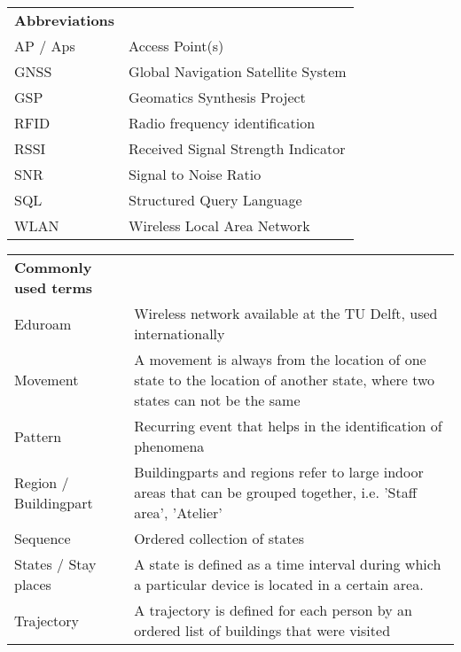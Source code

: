 \begin{table}[H]
\label{my-label}
\begin{tabular}{ll}
\textbf{Abbreviations} &                                    \\
AP / Aps               & Access Point(s)                    \\
GNSS                   & Global Navigation Satellite System \\
GSP                    & Geomatics Synthesis Project        \\
RFID                   & Radio frequency identification     \\
RSSI                   & Received Signal Strength Indicator \\
SNR                    & Signal to Noise Ratio              \\
SQL                    & Structured Query Language          \\
WLAN                   & Wireless Local Area Network        \\
\end{tabular}
\end{table}
\begin{table}[H]
\label{my-label}
\begin{tabular}{ll}
\textbf{Commonly used terms} &                                                                                                                            \\
Eduroam                      & Wireless network available at the TU Delft, used internationally                                                          \\
Movement                     & A movement is always from the location of one state to the location of another state, where two states can not be the same \\
Pattern                      & Recurring event that helps in the identification of phenomena                                                              \\
Region / Buildingpart        & Buildingparts and regions refer to large indoor areas that can be grouped together, i.e. 'Staff area', 'Atelier'           \\
Sequence                     & Ordered collection of states                                                                                               \\
States / Stay places         & A state is defined as a time interval during which a particular device is located in a certain area.                       \\
Trajectory                   & A trajectory is defined for each person by an ordered list of buildings that were visited                                  \\
\end{tabular}
\end{table}
